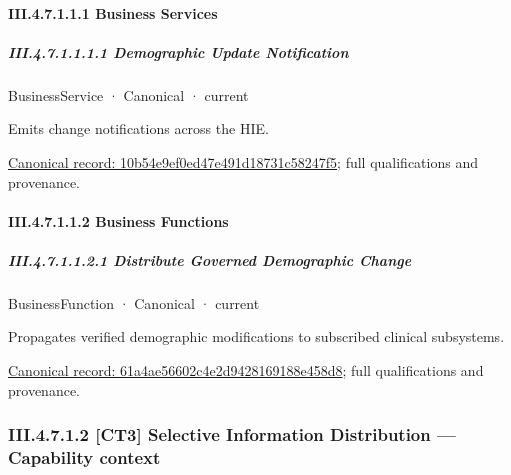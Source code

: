 \paragraph*{III.4.7.1.1.1 Business Services}
\label{navigation:III.4.7.1.1.1}

\subparagraph*{III.4.7.1.1.1.1 Demographic Update Notification}
\label{navigation:III.4.7.1.1.1.1}

\label{element:10b54e9ef0ed47e491d18731c58247f5}
{\small BusinessService · Canonical · current}\par

Emits change notifications across the HIE.


{\footnotesize \href{../../../../continuum/business/business-service/10b54e9ef0ed47e491d18731c58247f5.md}{Canonical record: 10b54e9ef0ed47e491d18731c58247f5}; full qualifications and provenance.}\par
\paragraph*{III.4.7.1.1.2 Business Functions}
\label{navigation:III.4.7.1.1.2}

\subparagraph*{III.4.7.1.1.2.1 Distribute Governed Demographic Change}
\label{navigation:III.4.7.1.1.2.1}

\label{element:61a4ae56602c4e2d9428169188e458d8}
{\small BusinessFunction · Canonical · current}\par

Propagates verified demographic modifications to subscribed clinical subsystems.


{\footnotesize \href{../../../../continuum/business/business-function/61a4ae56602c4e2d9428169188e458d8.md}{Canonical record: 61a4ae56602c4e2d9428169188e458d8}; full qualifications and provenance.}\par
\subsubsection*{III.4.7.1.2 [CT3] Selective Information Distribution — Capability context}
\label{navigation:III.4.7.1.2}

